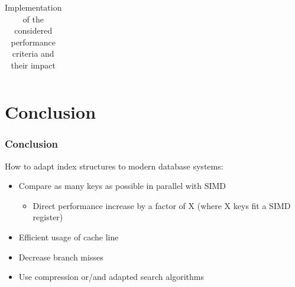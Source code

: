 \documentclass{beamer}
\begin{document}
\begin{frame}
\begin{table}[ht]
\begin{tabular}{l|c|c|c|c|c|c}
	\end{tabular}

	\caption{Implementation of the considered performance criteria and their impact}\label{tab:procCap}
\end{table}


\end{frame}

\section{Conclusion}
\begin{frame}
\frametitle{Conclusion}
How to adapt index structures to modern database systems:
\begin{itemize}[label=\textbullet,leftmargin=2em]
\item Compare as many keys as possible in parallel with SIMD
\begin{itemize}[label=\textbullet,leftmargin=1em]
\item Direct performance increase  by a factor of X (where X keys fit a SIMD register)
\end{itemize}
\item Efficient usage of cache line
\item Decrease branch misses
\item Use compression or/and adapted search algorithms
\end{itemize}
\end{frame}
\end{document}
